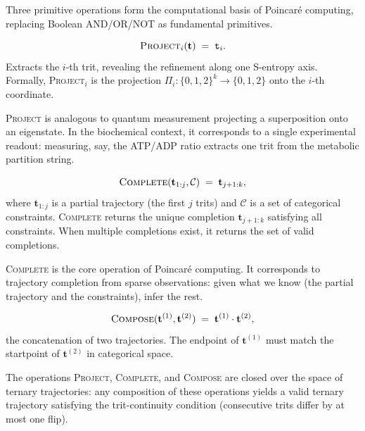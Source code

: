 Three primitive operations form the computational basis of Poincaré computing,
replacing Boolean AND/OR/NOT as fundamental primitives.

\begin{definition}
\label{def:project}
\[
    \textsc{Project}_i(\mathbf{t}) \;=\; \mathtt{t}_i.
\]
Extracts the $i$-th trit, revealing the refinement along one S-entropy axis.
Formally, \textsc{Project}$_i$ is the projection $\Pi_i : \{0,1,2\}^k \to
\{0,1,2\}$ onto the $i$-th coordinate.
\end{definition}

\textsc{Project} is analogous to quantum measurement projecting a superposition
onto an eigenstate.  In the biochemical context, it corresponds to a single
experimental readout: measuring, say, the ATP/ADP ratio extracts one trit from
the metabolic partition string.

\begin{definition}
\label{def:complete}
\[
    \textsc{Complete}(\mathbf{t}_{1:j}, \mathcal{C})
    \;=\; \mathbf{t}_{j+1:k},
\]
where $\mathbf{t}_{1:j}$ is a partial trajectory (the first $j$ trits) and
$\mathcal{C}$ is a set of categorical constraints.  \textsc{Complete} returns
the unique completion $\mathbf{t}_{j+1:k}$ satisfying all constraints.
When multiple completions exist, it returns the set of valid completions.
\end{definition}

\textsc{Complete} is the core operation of Poincaré computing.  It corresponds
to trajectory completion from sparse observations: given what we know (the
partial trajectory and the constraints), infer the rest.

\begin{definition}
\label{def:compose}
\[
    \textsc{Compose}(\mathbf{t}^{(1)}, \mathbf{t}^{(2)})
    \;=\; \mathbf{t}^{(1)} \cdot \mathbf{t}^{(2)},
\]
the concatenation of two trajectories.  The endpoint of $\mathbf{t}^{(1)}$
must match the startpoint of $\mathbf{t}^{(2)}$ in categorical space.
\end{definition}

\begin{proposition}
\label{prop:closure}
The operations \textsc{Project}, \textsc{Complete}, and \textsc{Compose} are
closed over the space of ternary trajectories: any composition of these
operations yields a valid ternary trajectory satisfying the trit-continuity
condition (consecutive trits differ by at most one flip).
\end{proposition}

